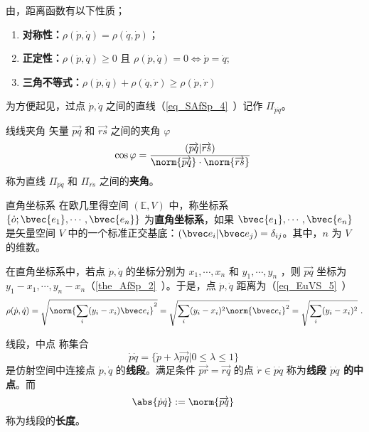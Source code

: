 由，距离函数有以下性质；
\begin{enumerate}
\item \textbf{对称性：}$\rho(\dot p,\dot q)=\rho(\dot q,\dot p)$；
\item \textbf{正定性：}$\rho(\dot p,\dot q)\geq 0$ 且 $\rho(\dot p,\dot q)= 0\Leftrightarrow\dot p=\dot q$;
\item \textbf{三角不等式：}$\rho(\dot p,\dot q)+\rho(\dot q,\dot r)\geq\rho(\dot p,\dot r)$
\end{enumerate}
为方便起见，过点 $\dot p,\dot q$ 之间的直线（\autoref{eq_SAfSp_4}~）记作 $\Pi_{\dot p\dot q}$。
\begin{definition}{线线夹角}
矢量 $\overrightarrow{pq}$ 和 $\overrightarrow{rs}$ 之间的夹角 $\varphi$
\begin{equation}
\cos\varphi=\frac{(\overrightarrow{pq}|\overrightarrow{rs})}{\norm{\overrightarrow{pq}}\cdot\norm{\overrightarrow{rs}}}~
\end{equation}
称为直线 $\Pi_{\dot p\dot q}$ 和 $\Pi_{\dot r\dot s}$ 之间的\textbf{夹角}。
\end{definition}
\begin{definition}{直角坐标系}
在欧几里得空间 $(\mathbb E,V)$ 中，称坐标系 $\{\dot o;\bvec{e_1},\cdots,\bvec{e_n}\}$ 为\textbf{直角坐标系}，如果 $\bvec{e_1},\cdots,\bvec{e_n}$ 是矢量空间 $V$ 中的一个标准正交基底：$(\bvec e_i|\bvec e_j)=\delta_{ij}$。其中，$n$ 为 $V$ 的维数。
\end{definition}
\begin{example}{}
在直角坐标系中，若点 $\dot p,\dot q$ 的坐标分别为 $x_1,\cdots,x_n$ 和 $y_1,\cdots,y_n$ ，则 $\overrightarrow{pq}$ 坐标为 $y_1-x_1,\cdots,y_n-x_n$（\autoref{the_AfSp_2}~）。于是，点 $\dot p,\dot q$ 距离为（\autoref{eq_EuVS_5}~）
\begin{equation}
\rho(\dot p,\dot q)=\sqrt{\norm{\sum_{i}(y_i-x_i)\bvec e_i}^2}=\sqrt{\sum_{i}(y_i-x_i)^2\norm{\bvec e_i}^2}=\sqrt{\sum_{i}(y_i-x_i)^2}~.
\end{equation}
\end{example}
\begin{definition}{线段，中点}
称集合
\begin{equation}
\dot p\dot q=\{\dot p+\lambda\overrightarrow{pq}|0\leq\lambda\leq1\}~
\end{equation}
是仿射空间中连接点 $\dot p,\dot q$ 的\textbf{线段}。满足条件 $\overrightarrow{pr}=\overrightarrow{rq}$ 的点 $\dot r\in\dot p\dot q$ 称为\textbf{线段 $\dot p\dot q$ 的中点}。而
\begin{equation}
\abs{\dot p\dot q}:=\norm{\overrightarrow{pq}}~
\end{equation}
称为线段的\textbf{长度}。
\end{definition}
